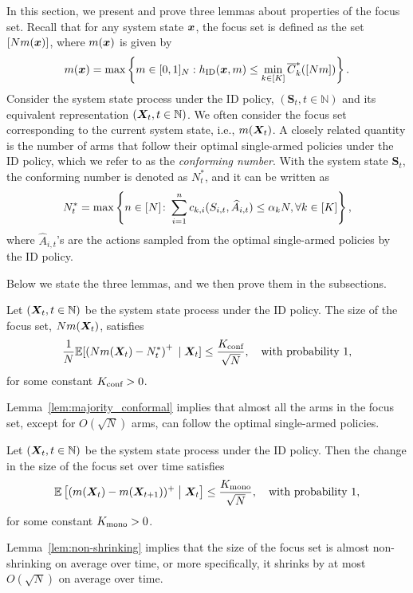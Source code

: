 In this section, we present and prove three lemmas about properties of the focus set.
Recall that for any system state $\bm{x}$, the focus set is defined as the set $[Nm(\bm{x})]$, where $m(\bm{x})$ is given by
\begin{align}
    m(\bm{x})= \max \left\{  m\in[0,1]_N: h_{\textnormal{ID}}(\bm{x},m)\leq \min_{k\in[K]}\overline{C}^*_k([Nm]) \right\}.
\end{align}
Consider the system state process under the ID policy, $(\bm{S}_t,t\in\mathbb{N})$ and its equivalent representation $({\bm{X}}_t,t\in\mathbb{N})$.
We often consider the focus set corresponding to the current system state, i.e., $m({\bm{X}}_t)$.
A closely related quantity is the number of arms that follow their optimal single-armed policies under the ID policy, which we refer to as the \emph{conforming number}.
With the system state $\bm{S}_t$, the conforming number is denoted as $N^*_t$, and it can be written as
\begin{equation}
    N_t^* = \max\left\{ n\in[N]\colon \sum_{i=1}^n c_{k,i}(S_{i,t},\widehat{A}_{i,t})\leq \alpha_k N, \forall k\in[K] \right\},
\end{equation}
where $\widehat{A}_{i,t}$'s are the actions sampled from the optimal single-armed policies by the ID policy.


Below we state the three lemmas, and we then prove them in the subsections.

\begin{lemma}\label{lem:majority_conformal}
Let $({\bm{X}}_t,t\in\mathbb{N})$ be the system state process under the ID policy.
The size of the focus set, $Nm({\bm{X}}_t)$, satisfies
\begin{align*}
    \frac{1}{N}\mathbb{E}[\left(Nm({\bm{X}}_t) - N_t^* \right)^+ \;|\; {\bm{X}}_t]\leq \frac{K_{\text{conf}}}{\sqrt{N}}, \quad\text{with probability }1,
\end{align*}
for some constant $K_{\text{conf}}>0$.
\end{lemma}
Lemma~\ref{lem:majority_conformal} implies that almost all the arms in the focus set, except for $O(\sqrt{N})$ arms, can follow the optimal single-armed policies.

\begin{lemma}\label{lem:non-shrinking}
Let $({\bm{X}}_t,t\in\mathbb{N})$ be the system state process under the ID policy.
Then the change in the size of the focus set over time satisfies
    \begin{align*}
    \mathbb{E}\left[(m({\bm{X}}_t)-m({\bm{X}}_{t+1}))^+ \;\middle|\; {\bm{X}}_t\right] \leq  \frac{K_{\text{mono}}}{\sqrt{N}},\quad\text{with probability }1,
\end{align*}
for some constant $K_{\text{mono}}>0$.
\end{lemma}
Lemma~\ref{lem:non-shrinking} implies that the size of the focus set is almost non-shrinking on average over time, or more specifically, it shrinks by at most $O(\sqrt{N})$ on average over time.



